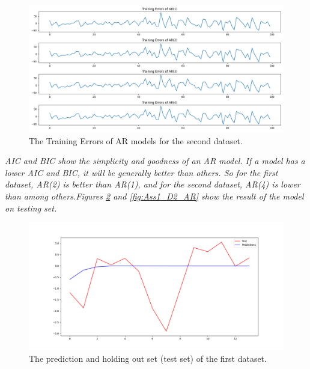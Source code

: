 \begin{figure}[H]
    \centering
    \begin{minipage}[b]{1\textwidth}
        \includegraphics[width=\textwidth]{figures/Ass1/Ass1_D2_Training Errors of ARs models.png}
    \end{minipage}
    \caption{The Training Errors of AR models for the second dataset. }
    \label{fig:Ass1_D2_Training Errors of ARs models}
\end{figure}

\textit{\Gls{AIC} and \gls{BIC} show the simplicity and goodness of an \gls{AR} model. If a model has a lower \Gls{AIC} and \gls{BIC}, it will be generally better than others. So for the first dataset, \gls{AR}(2) is better than \gls{AR}(1), and for the second dataset, \gls{AR}(4) is lower than among others.Figures \ref{fig:Ass1_D1_AR} and \ref{fig:Ass1_D2_AR} show the result of the model on testing set.}




\begin{figure}[H]
    \centering
    \begin{minipage}[b]{1\textwidth}
        \includegraphics[width=\textwidth]{figures/Ass1/Ass1_D1_AR.png}
    \end{minipage}
    \caption{The prediction and holding out set (test set) of the first dataset. }
    \label{fig:Ass1_D1_AR}
\end{figure}

